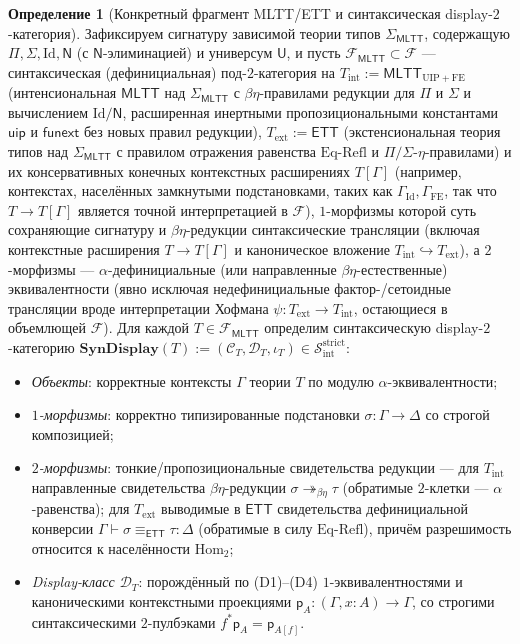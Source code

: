\documentclass[11pt]{article}
\theoremstyle{plain}
\theoremstyle{definition}
\newtheorem{definition}[theorem]{Определение}
\newcommand{\cF}{\mathcal{F}}
\newcommand{\cC}{\mathcal{C}}
\newcommand{\cD}{\mathcal{D}}
\newcommand{\Hom}{\mathrm{Hom}}
\newcommand{\MLTT}{\mathsf{MLTT}}
\newcommand{\ETT}{\mathsf{ETT}}
\begin{document}
\begin{definition}[Конкретный фрагмент MLTT/ETT и синтаксическая display-$2$-категория]\label{def:I-fragment}
Зафиксируем сигнатуру зависимой теории типов $\Sigma_{\MLTT}$, содержащую $\Pi, \Sigma, \mathrm{Id}, \mathsf{N}$ (с $\mathsf{N}$-элиминацией) и универсум $\mathsf{U}$, и пусть $\mathcal{F}_{\MLTT} \subset \cF$ — синтаксическая (дефинициальная) под-$2$-категория на $T_{\mathrm{int}} := \MLTT_{\mathrm{UIP}+\mathrm{FE}}$ (интенсиональная $\MLTT$ над $\Sigma_{\MLTT}$ с $\beta\eta$-правилами редукции для $\Pi$ и $\Sigma$ и вычислением $\mathrm{Id}/\mathsf{N}$, расширенная инертными пропозициональными константами $\mathsf{uip}$ и $\mathsf{funext}$ без новых правил редукции), $T_{\mathrm{ext}} := \ETT$ (экстенсиональная теория типов над $\Sigma_{\MLTT}$ с правилом отражения равенства $\text{Eq-Refl}$ и $\Pi/\Sigma$-$\eta$-правилами) и их консервативных конечных контекстных расширениях $T[\Gamma]$ (например, контекстах, населённых замкнутыми подстановками, таких как $\Gamma_{\mathrm{Id}}, \Gamma_{\mathrm{FE}}$, так что $T \to T[\Gamma]$ является точной интерпретацией в $\cF$), $1$-морфизмы которой суть сохраняющие сигнатуру и $\beta\eta$-редукции синтаксические трансляции (включая контекстные расширения $T \to T[\Gamma]$ и каноническое вложение $T_{\mathrm{int}} \hookrightarrow T_{\mathrm{ext}}$), а $2$-морфизмы — $\alpha$-дефинициальные (или направленные $\beta\eta$-естественные) эквивалентности (явно исключая недефинициальные фактор-/сетоидные трансляции вроде интерпретации Хофмана $\psi : T_{\mathrm{ext}} \to T_{\mathrm{int}}$, остающиеся в объемлющей $\cF$). Для каждой $T \in \mathcal{F}_{\MLTT}$ определим синтаксическую display-$2$-категорию $\mathbf{SynDisplay}(T) := (\cC_T, \cD_T, \iota_T) \in \mathcal{S}_{\mathrm{int}}^{\mathrm{strict}}$:
\begin{itemize}[nosep]
\item \emph{Объекты}: корректные контексты $\Gamma$ теории $T$ по модулю $\alpha$-эквивалентности;
\item \emph{$1$-морфизмы}: корректно типизированные подстановки $\sigma : \Gamma \to \Delta$ со строгой композицией;
\item \emph{$2$-морфизмы}: тонкие/пропозициональные свидетельства редукции --- для $T_{\mathrm{int}}$ направленные свидетельства $\beta\eta$-редукции $\sigma \twoheadrightarrow_{\beta\eta} \tau$ (обратимые $2$-клетки — $\alpha$-равенства); для $T_{\mathrm{ext}}$ выводимые в $\ETT$ свидетельства дефинициальной конверсии $\Gamma \vdash \sigma \equiv_{\ETT} \tau : \Delta$ (обратимые в силу $\text{Eq-Refl}$), причём разрешимость относится к населённости $\Hom_2$;
\item \emph{Display-класс $\cD_T$}: порождённый по (D1)--(D4) $1$-эквивалентностями и каноническими контекстными проекциями $\mathsf{p}_A : (\Gamma, x : A) \to \Gamma$, со строгими синтаксическими $2$-пулбэками $f^*\mathsf{p}_A = \mathsf{p}_{A[f]}$.
\end{itemize}
\end{definition}
\end{document}
